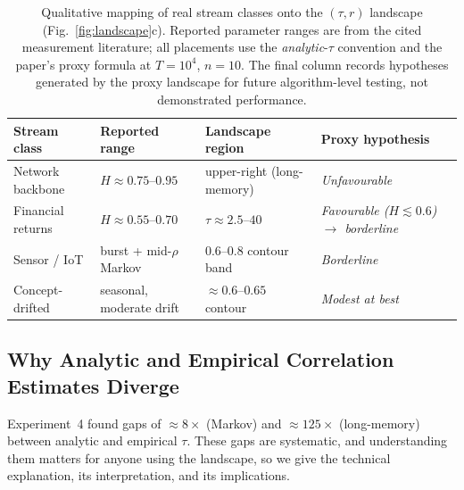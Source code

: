 \documentclass[sensors,article,submit,pdftex,moreauthors]{Definitions/mdpi}
\begin{document}
\begin{table}[t]
\centering
\caption{Qualitative mapping of real stream classes onto the $(\tau, r)$ landscape (Fig.~\ref{fig:landscape}c). Reported parameter ranges are from the cited measurement literature; all placements use the \emph{analytic}-$\tau$ convention and the paper's proxy formula at $T = 10^{4}$, $n = 10$. The final column records hypotheses generated by the proxy landscape for future algorithm-level testing, not demonstrated performance.}
\label{tab:stream_classes}
\begin{tabularx}{\textwidth}{@{}lp{2.9cm}XX@{}}
\toprule
Stream class & Reported range & Landscape region & Proxy hypothesis \\
\midrule
Network backbone & $H \approx 0.75$--$0.95$ & upper-right (long-memory) & \emph{Unfavourable} \\
Financial returns & $H \approx 0.55$--$0.70$ & $\tau \approx 2.5$--$40$ & \emph{Favourable ($H {\lesssim} 0.6$) $\to$ borderline} \\
Sensor / IoT & burst + mid-$\rho$ Markov & $0.6$--$0.8$ contour band & \emph{Borderline} \\
Concept-drifted & seasonal, moderate drift & ${\approx}0.6$--$0.65$ contour & \emph{Modest at best} \\
\bottomrule
\end{tabularx}
\end{table}

\subsection{Why Analytic and Empirical Correlation Estimates Diverge}
\label{sec:divergence}

Experiment~4 found gaps of ${\approx}8\times$ (Markov) and ${\approx}125\times$ (long-memory) between analytic and empirical $\tau$. These gaps are systematic, and understanding them matters for anyone using the landscape, so we give the technical explanation, its interpretation, and its implications.
\end{document}

